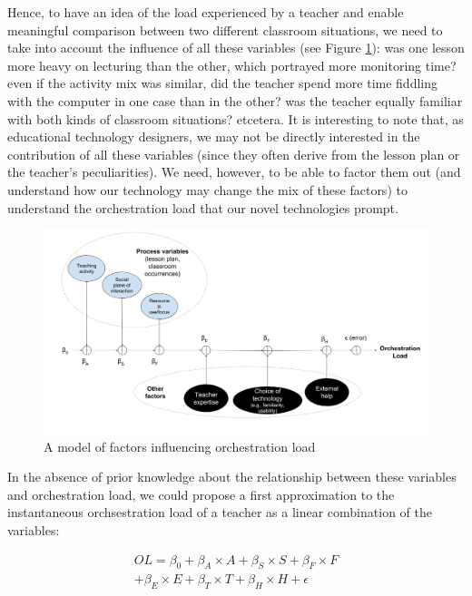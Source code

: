 \documentclass[10pt,journal,compsoc]{IEEEtran}
\begin{document}
Hence, to have an idea of the load experienced by a teacher and enable meaningful comparison between two different classroom situations, we need to take into account the influence of all these variables (see Figure \ref{fig:model}): was one lesson more heavy on lecturing than the other, which portrayed more monitoring time? even if the activity mix was similar, did the teacher spend more time fiddling with the computer in one case than in the other? was the teacher equally familiar with both kinds of classroom situations? etcetera. It is interesting to note that, as educational technology designers, we may not be directly interested in the contribution of all these variables (since they often derive from the lesson plan or the teacher's peculiarities). We need, however, to be able to factor them out (and understand how our technology may change the mix of these factors) to understand the orchestration load that our novel technologies prompt.


\begin{figure}[!t]
\centering
\includegraphics[width=\linewidth]{img/ModelFactorsOL}
\caption{A model of factors influencing orchestration load}
\label{fig:model}
\end{figure}

In the absence of prior knowledge about the relationship between these variables and orchestration load, we could propose a first approximation to the instantaneous orchsestration load of a teacher as a linear combination of the variables:

\begin{multline}
\label{formOLScat}
OL = \beta_0 + \beta_A\times{}A + \beta_S\times{}S + \beta_F\times{}F \\ + \beta_E\times{}E + \beta_T\times{}T + \beta_H\times{}H + \epsilon
\end{multline}
\end{document}

